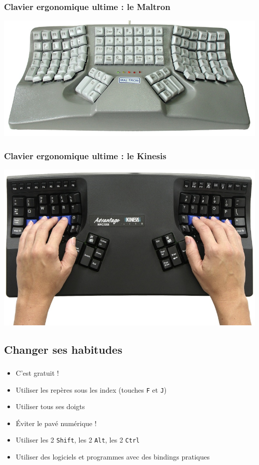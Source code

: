 \documentclass[c,12pt]{beamer}
\begin{document}
\begin{frame}
	\frametitle{Clavier ergonomique ultime : le Maltron}
	\begin{center}
		\includegraphics[scale=0.35]{maltron.jpg}
	\end{center}
\end{frame}

\begin{frame}
	\frametitle{Clavier ergonomique ultime : le Kinesis}
	\begin{center}
		\includegraphics[scale=0.35]{kinesis.jpg}
	\end{center}
\end{frame}

\subsection{Changer ses habitudes}

\begin{frame}
	\frametitle{\subsecname}
	\begin{itemize}
		\item<1->{C'est gratuit !}
		\item<2->{Utiliser les repères sous les index (touches \texttt{F} et
			\texttt{J})}
		\item<3->{Utiliser tous ses doigts}
		\item<4->{Éviter le pavé numérique !}
		\item<5->{Utiliser les 2 \texttt{Shift}, les 2 \texttt{Alt}, les 2
			\texttt{Ctrl}}
		\item<6->{Utiliser des logiciels et programmes avec des bindings pratiques}
	\end{itemize}
\end{frame}
\end{document}
